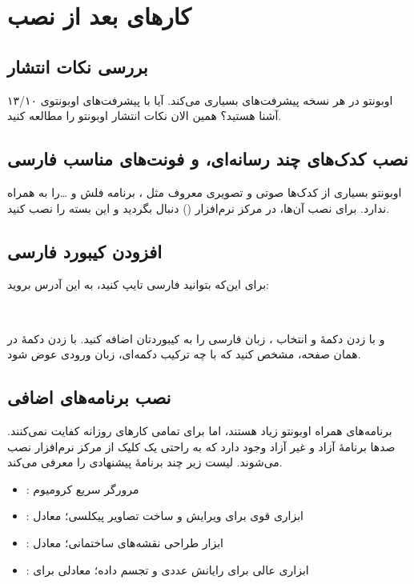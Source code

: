 \chapter{کارهای بعد از نصب}
\section{بررسی نکات انتشار}
 اوبونتو در هر نسخه پیشرفت‌های بسیاری می‌کند. آیا با پیشرفت‌های اوبونتوی ۱۳/۱۰ آشنا هستید؟ همین الان نکات انتشار اوبونتو را مطالعه کنید.

\section[نصب کدک‌های چند رسانه‌ای، Flash Adobe و فونت‌های مناسب فارسی]{نصب کدک‌های چند رسانه‌ای،  و فونت‌های مناسب فارسی}
اوبونتو بسیاری از کدک‌ها صوتی و تصویری معروف مثل ، برنامه فلش و \ldots را به همراه ندارد. برای نصب آن‌ها، در مرکز نرم‌افزار () دنبال  بگردید و این بسته را نصب کنید.

\section{افزودن کیبورد فارسی}
برای این‌که بتوانید فارسی تایپ کنید، به این آدرس بروید:
\begin{flushleft}
\\
\end{flushleft}
و با زدن دکمهٔ \lr{+} و انتخاب ، زبان فارسی را به کیبوردتان اضافه کنید. با زدن دکمهٔ  در همان صفحه، مشخص کنید که با چه ترکیب دکمه‌ای، زبان ورودی عوض شود.
\section{نصب برنامه‌های اضافی}
برنامه‌های همراه اوبونتو زیاد هستند، اما برای تمامی کارهای روزانه کفایت نمی‌کنند. صدها برنامهٔ آزاد و غیر آزاد وجود دارد که به راحتی یک کلیک از مرکز نرم‌افزار نصب می‌شوند. لیست زیر چند برنامهٔ پیشنهادی را معرفی می‌کند.
\begin{itemize}
\item {}: مرورگر سریع کرومیوم
\item {}: ابزاری قوی برای ویرایش و ساخت تصاویر پیکلسی؛ معادل 
\item {}: ابزار طراحی نقشه‌های ساختمانی؛ معادل 
\item {}: ابزاری عالی برای رایانش عددی و تجسم داده؛ معادلی برای 
\end{itemize}

